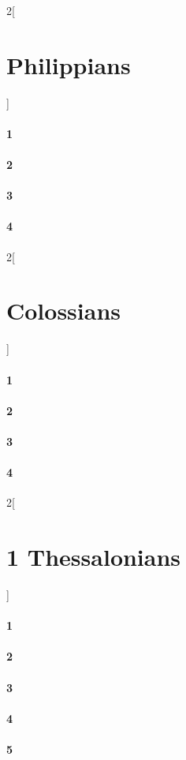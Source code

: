 \documentclass{book}
\begin{document}
\begin{multicols}{2}[\part{Philippians}]
\subsection*{1}
\subsection*{2}
\subsection*{3}
\subsection*{4}
\end{multicols}
\begin{multicols}{2}[\part{Colossians}]
\subsection*{1}
\subsection*{2}
\subsection*{3}
\subsection*{4}
\end{multicols}
\begin{multicols}{2}[\part{1 Thessalonians}]
\subsection*{1}
\subsection*{2}
\subsection*{3}
\subsection*{4}
\subsection*{5}
\end{multicols}
\end{document}
